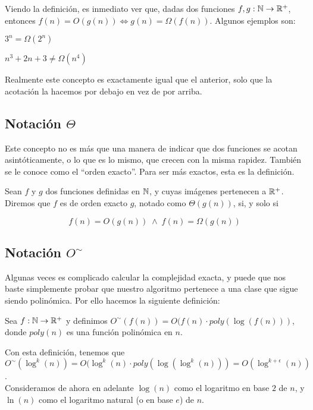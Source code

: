 Viendo la definición, es inmediato ver que, dadas dos funciones $f,g:\mathbb{N} \to \mathbb{R}^+$, entonces $f(n) = O(g(n)) \Leftrightarrow g(n) = \Omega(f(n))$. Algunos ejemplos son:

\begin{ejemplo}
	$3^n = \Omega(2^n)$
\end{ejemplo}

\begin{ejemplo}
	$n^3 + 2n + 3 \neq \Omega(n^4)$
\end{ejemplo}

Realmente este concepto es exactamente igual que el anterior, solo que la acotación la hacemos por debajo en vez de por arriba.

\subsection{Notación $\Theta$}

Este concepto no es más que una manera de indicar que dos funciones se acotan asintóticamente, o lo que es lo mismo, que crecen con la misma rapidez. También se le conoce como el ``orden exacto''. Para ser más exactos, esta es la definición.

\begin{definicion}
	Sean $f$ y $g$ dos funciones definidas en $\mathbb{N}$, y cuyas imágenes pertenecen a $\mathbb{R}^+$. Diremos que $f$ es de orden exacto $g$, notado como $\Theta(g(n))$, si, y solo si
	
	$$f(n) = O(g(n))\;\wedge\;f(n) = \Omega(g(n))$$
\end{definicion}

\subsection{Notación $O^\sim$}

Algunas veces es complicado calcular la complejidad exacta, y puede que nos baste simplemente probar que nuestro algoritmo pertenece a una clase que sigue siendo polinómica. Por ello hacemos la siguiente definición:

\begin{definicion}
	Sea $f:\mathbb{N} \to \mathbb{R}^+$ y definimos $O^\sim(f(n)) = O(f(n) \cdot poly(\log(f(n)))$, donde $poly(n)$ es una función polinómica en $n$.
\end{definicion}

Con esta definición, tenemos que $O^\sim(\log^k(n)) = O(\log^k(n) \cdot poly(\log(\log^k(n))) = O(\log^{k+\epsilon}(n))$.\\

Consideramos de ahora en adelante $\log(n)$ como el logaritmo en base $2$ de $n$, y $\ln(n)$ como el logaritmo natural (o en base $e$) de $n$.

\endinput
